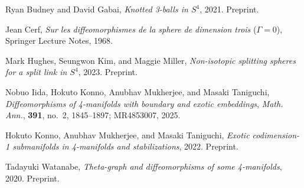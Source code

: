 \documentclass[11pt,letterpaper,twoside]{amsart}
\theoremstyle{definition}
\begin{document}
\begin{thebibliography}{AKMR}
     Ryan Budney and David Gabai, \textit{Knotted 3-balls in $S^4$}, 2021. Preprint. 

    Jean Cerf, \textit{Sur les diffeomorphismes de la sphere de dimension trois} ($\Gamma=0$), Springer Lecture Notes, 1968.

    Mark Hughes, Seungwon Kim, and Maggie Miller, \textit{Non-isotopic splitting spheres for a split link in $S^4$}, 2023. Preprint.

    Nobuo Iida, Hokuto Konno, Anubhav Mukherjee, and Masaki Taniguchi, \textit{Diffeomorphisms of 4-manifolds with boundary and exotic embeddings}, \textit{Math. Ann.}, {\bf 391}, no.~2, 1845--1897; MR4853007, 2025.

   Hokuto Konno, Anubhav Mukherjee, and Masaki Taniguchi, \textit{Exotic codimension-1 submanifolds in 4-manifolds and stabilizations}, 2022. Preprint.

    Tadayuki Watanabe, \textit{Theta-graph and diffeomorphisms of some 4-manifolds}, 2020. Preprint. 
\end{thebibliography}
\end{document}
